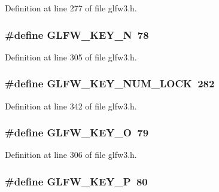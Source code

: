 Definition at line 277 of file glfw3.\-h.

\hypertarget{group__keys_gae00856dfeb5d13aafebf59d44de5cdda}{
\subsubsection[{G\-L\-F\-W\-\_\-\-K\-E\-Y\-\_\-\-N}]{\setlength{\rightskip}{0pt plus 5cm}\#define G\-L\-F\-W\-\_\-\-K\-E\-Y\-\_\-\-N~78}}\label{group__keys_gae00856dfeb5d13aafebf59d44de5cdda}


Definition at line 305 of file glfw3.\-h.

\hypertarget{group__keys_ga3946edc362aeff213b2be6304296cf43}{
\subsubsection[{G\-L\-F\-W\-\_\-\-K\-E\-Y\-\_\-\-N\-U\-M\-\_\-\-L\-O\-C\-K}]{\setlength{\rightskip}{0pt plus 5cm}\#define G\-L\-F\-W\-\_\-\-K\-E\-Y\-\_\-\-N\-U\-M\-\_\-\-L\-O\-C\-K~282}}\label{group__keys_ga3946edc362aeff213b2be6304296cf43}


Definition at line 342 of file glfw3.\-h.

\hypertarget{group__keys_gaecbbb79130df419d58dd7f09a169efe9}{
\subsubsection[{G\-L\-F\-W\-\_\-\-K\-E\-Y\-\_\-\-O}]{\setlength{\rightskip}{0pt plus 5cm}\#define G\-L\-F\-W\-\_\-\-K\-E\-Y\-\_\-\-O~79}}\label{group__keys_gaecbbb79130df419d58dd7f09a169efe9}


Definition at line 306 of file glfw3.\-h.

\hypertarget{group__keys_ga8fc15819c1094fb2afa01d84546b33e1}{
\subsubsection[{G\-L\-F\-W\-\_\-\-K\-E\-Y\-\_\-\-P}]{\setlength{\rightskip}{0pt plus 5cm}\#define G\-L\-F\-W\-\_\-\-K\-E\-Y\-\_\-\-P~80}}\label{group__keys_ga8fc15819c1094fb2afa01d84546b33e1}


